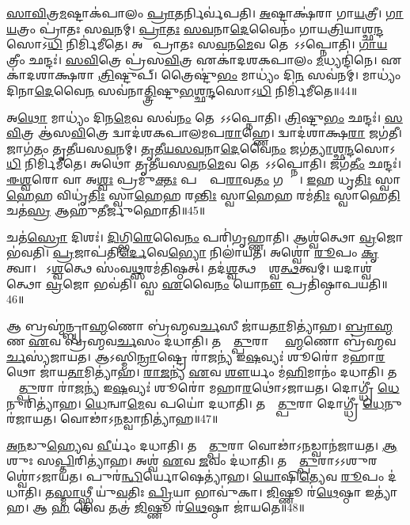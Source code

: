 \ul{𑌸𑌾}\ul{𑌵𑌿}𑌤𑍍𑌰\ul{𑌮}𑌷𑍍𑌟𑌾𑌕॑𑌪𑌾𑌲𑌂 \ul{𑌪𑍍𑌰𑌾}𑌤𑌰𑍍𑌨𑌿𑌰𑍍𑌵॑𑌪𑌤𑌿।
\ul{𑌅}𑌷𑍍𑌟𑌾𑌕𑍍𑌷॑𑌰𑌾 𑌗𑌾\ul{𑌯}𑌤𑍍𑌰𑍀।
\ul{𑌗𑌾}\ul{𑌯}𑌤𑍍𑌰𑌂 𑌪𑍍𑌰𑌾॑𑌤𑌃 𑌸\ul{𑌵}𑌨𑌮𑍍।
\ul{𑌪𑍍𑌰𑌾}\ul{𑌤𑌃} \ul{𑌸}\ul{𑌵}𑌨𑌾\ul{𑌦𑍇}𑌵𑍈𑌨𑌂॑ 𑌗𑌾𑌯\ul{𑌤𑍍𑌰𑌿}𑌯𑌾𑌶𑍍𑌛\ul{𑌨𑍍𑌦}𑌸𑍋\-𑌽\ul{𑌧𑌿} 𑌨𑌿𑌰𑍍𑌮𑌿॑𑌮𑍀𑌤𑍇।
𑌅𑌥𑍋᳚ 𑌪𑍍𑌰𑌾𑌤𑌃 𑌸\ul{𑌵}𑌨\ul{𑌮𑍇}𑌵 𑌤𑍇𑌨𑌾᳚𑌽𑌽𑌪𑍍𑌨𑍋𑌤𑌿।
\ul{𑌗𑌾}\ul{𑌯}𑌤𑍍𑌰𑍀𑌂 𑌛𑌨𑍍𑌦𑌃॑।
\ul{𑌸}\ul{𑌵𑌿}𑌤𑍍𑌰𑍇 𑌪𑍍𑌰॑𑌸\ul{𑌵𑌿}𑌤𑍍𑌰 𑌏𑌕𑌾॑𑌦𑌶𑌕𑌪𑌾𑌲𑌂 \ul{𑌮}𑌧𑍍𑌯𑌨𑍍𑌦𑌿॑𑌨𑍇।
𑌏𑌕𑌾॑𑌦𑌶𑌾𑌕𑍍𑌷𑌰𑌾 \ul{𑌤𑍍𑌰𑌿}𑌷𑍍𑌟𑍁𑌪𑍍।
𑌤𑍍𑌰𑍈𑌷𑍍𑌟𑍁॑\ul{𑌭𑌂} 𑌮𑌾𑌧𑍍𑌯𑌂॑ 𑌦𑌿\ul{𑌨}\ul{} 𑌸𑌵॑𑌨𑌮𑍍।
𑌮𑌾𑌧𑍍𑌯𑌂॑ 𑌦𑌿𑌨𑌾\ul{𑌦𑍇}𑌵𑍈\ul{𑌨}\ul{} 𑌸𑌵॑𑌨𑌾\ul{𑌤𑍍𑌤𑍍𑌰𑌿}𑌷𑍍𑌟𑍁\ul{𑌭}𑌶𑍍𑌛\ul{𑌨𑍍𑌦}𑌸𑍋𑌽\ul{𑌧𑌿} 𑌨𑌿𑌰𑍍𑌮𑌿॑𑌮𑍀𑌤𑍇॥44॥

𑌅\ul{𑌥𑍋} 𑌮𑌾𑌧𑍍𑌯𑌂॑ 𑌦𑌿𑌨\ul{𑌮𑍇}𑌵 𑌸𑌵॑\ul{𑌨𑌂} 𑌤𑍇𑌨𑌾᳚𑌽𑌽𑌪𑍍𑌨𑍋𑌤𑌿।
\ul{𑌤𑍍𑌰𑌿}𑌷𑍍𑌟𑍁\ul{𑌭𑌂} 𑌛𑌨𑍍𑌦𑌃॑।
\ul{𑌸}\ul{𑌵𑌿}𑌤𑍍𑌰 𑌆॑𑌸\ul{𑌵𑌿}𑌤𑍍𑌰𑍇 𑌦𑍍𑌵𑌾𑌦॑𑌶𑌕𑌪𑌾𑌲𑌮𑌪\ul{𑌰𑌾}𑌹𑍍𑌣𑍇।
𑌦𑍍𑌵𑌾𑌦॑𑌶𑌾𑌕𑍍𑌷\ul{𑌰𑌾} 𑌜𑌗॑𑌤𑍀।
𑌜𑌾𑌗॑𑌤𑌂 𑌤𑍃𑌤𑍀𑌯𑌸\ul{𑌵}𑌨𑌮𑍍।
\ul{𑌤𑍃}\ul{𑌤𑍀}\ul{𑌯}\ul{𑌸}\ul{𑌵}𑌨𑌾\ul{𑌦𑍇}𑌵𑍈\ul{𑌨𑌂} 𑌜𑌗॑\ul{𑌤𑍍𑌯𑌾}𑌶𑍍𑌛\ul{𑌨𑍍𑌦}𑌸𑍋𑌽\ul{𑌧𑌿} 𑌨𑌿𑌰𑍍𑌮𑌿॑𑌮𑍀𑌤𑍇।
𑌅𑌥𑍋॑ 𑌤𑍃𑌤𑍀𑌯𑌸\ul{𑌵}𑌨\ul{𑌮𑍇}𑌵 𑌤𑍇𑌨𑌾᳚𑌽𑌽𑌪𑍍𑌨𑍋𑌤𑌿।
𑌜𑌗॑\ul{𑌤𑍀𑌂} 𑌛𑌨𑍍𑌦𑌃॑।
\ul{𑌈}\ul{𑌶𑍍𑌵}𑌰𑍋 𑌵𑌾 𑌅\ul{𑌶𑍍𑌵𑌃} 𑌪𑍍𑌰𑌮𑍁॑\ul{𑌕𑍍𑌤𑌃} 𑌪𑌰𑌾𑌂᳚ 𑌪\ul{𑌰𑌾}𑌵\ul{𑌤𑌂} 𑌗𑌨𑍍𑌤𑍋𑌃᳚।
\ul{𑌇}𑌹 𑌧𑍃\ul{𑌤𑌿𑌃} 𑌸𑍍𑌵𑌾\ul{𑌹𑍇}𑌹 𑌵𑌿𑌧𑍃॑\ul{𑌤𑌿𑌃} 𑌸𑍍𑌵𑌾\ul{𑌹𑍇}𑌹 𑌰\ul{𑌨𑍍𑌤𑌿𑌃} 𑌸𑍍𑌵𑌾\ul{𑌹𑍇}𑌹 𑌰𑌮॑\ul{𑌤𑌿𑌃} 𑌸𑍍𑌵𑌾𑌹𑍇\ul{𑌤𑌿} 𑌚𑌤॑\ul{𑌸𑍍𑌰} 𑌆𑌹𑍁॑𑌤𑍀𑌰𑍍𑌜𑍁𑌹𑍋𑌤𑌿॥45॥

𑌚𑌤॑\ul{𑌸𑍍𑌰𑍋} 𑌦𑌿𑌶𑌃॑।
\ul{𑌦𑌿}𑌗𑍍𑌭𑌿\ul{𑌰𑍇}𑌵𑍈\ul{𑌨𑌂} 𑌪𑌰𑌿॑𑌗𑍃𑌹𑍍𑌣𑌾𑌤𑌿।
𑌆𑌶𑍍𑌵॑𑌤𑍍𑌥𑍋 \ul{𑌵𑍍𑌰}𑌜𑍋 𑌭॑𑌵𑌤𑌿।
\ul{𑌪𑍍𑌰}𑌜𑌾𑌪॑𑌤𑌿\ul{𑌰𑍍𑌦𑍇}𑌵𑍇\ul{𑌭𑍍𑌯𑍋} 𑌨𑌿𑌲𑌾॑𑌯𑌤।
𑌅𑌶𑍍𑌵𑍋॑ \ul{𑌰𑍂}𑌪𑌂 \ul{𑌕𑍃}𑌤𑍍𑌵𑌾।
𑌸𑍋᳚𑌽\ul{𑌶𑍍𑌵}𑌤𑍍𑌥𑍇 𑌸𑌂॑𑌵\ul{𑌥𑍍𑌸}𑌰𑌮॑𑌤𑌿𑌷𑍍𑌠𑌤𑍍।
𑌤𑌦॑\ul{𑌶𑍍𑌵}𑌤𑍍𑌥𑌸𑍍𑌯𑌾᳚𑌶𑍍𑌵\ul{𑌤𑍍𑌥}𑌤𑍍𑌵𑌮𑍍।
𑌯𑌦𑌾𑌶𑍍𑌵॑𑌤𑍍𑌥𑍋 \ul{𑌵𑍍𑌰}𑌜𑍋 𑌭𑌵॑𑌤𑌿।
𑌸𑍍𑌵 \ul{𑌏}𑌵𑍈\ul{𑌨𑌂} 𑌯𑍋\ul{𑌨𑍗} 𑌪𑍍𑌰𑌤𑌿॑\-𑌷𑍍𑌠𑌾𑌪𑌯𑌤𑌿॥46॥\anuvakamend[\ul{𑌤𑍍𑌰𑌿}𑌷𑍍𑌟𑍁\ul{𑌭}𑌶𑍍𑌛\ul{𑌨𑍍𑌦}𑌸𑍋𑌽\ul{𑌧𑌿} 𑌨𑌿𑌰𑍍𑌮𑌿॑𑌮𑍀𑌤𑍇 𑌜𑍁𑌹𑍋\ul{𑌤𑌿} 𑌨𑌵॑ 𑌚]

𑌆 𑌬𑍍𑌰𑌹𑍍𑌮॑𑌨𑍍𑌬𑍍𑌰𑌾\ul{𑌹𑍍𑌮}𑌣𑍋 𑌬𑍍𑌰॑𑌹𑍍𑌮𑌵\ul{𑌰𑍍𑌚}𑌸𑍀 𑌜𑌾॑𑌯\ul{𑌤𑌾}𑌮𑌿𑌤𑍍𑌯𑌾॑𑌹।
\ul{𑌬𑍍𑌰𑌾}\ul{𑌹𑍍𑌮}𑌣 \ul{𑌏}𑌵 𑌬𑍍𑌰॑𑌹𑍍𑌮𑌵\ul{𑌰𑍍𑌚}𑌸𑌂 𑌦॑𑌧𑌾𑌤𑌿।
𑌤𑌸𑍍𑌮𑌾᳚\ul{𑌤𑍍𑌪𑍁}𑌰𑌾 𑌬𑍍𑌰𑌾᳚\ul{𑌹𑍍𑌮}𑌣𑍋 𑌬𑍍𑌰॑𑌹𑍍𑌮𑌵\ul{𑌰𑍍𑌚}𑌸𑍍𑌯॑𑌜𑌾𑌯𑌤।
𑌆𑌽𑌸𑍍𑌮𑌿\ul{𑌨𑍍𑌰𑌾}𑌷𑍍𑌟𑍍𑌰𑍇 𑌰𑌾॑\ul{𑌜}𑌨𑍍𑌯॑ 𑌇\ul{𑌷}𑌵𑍍𑌯𑌃॑ 𑌶𑍂𑌰𑍋॑ 𑌮𑌹𑌾\ul{𑌰}𑌥𑍋 𑌜𑌾॑𑌯\ul{𑌤𑌾}𑌮𑌿𑌤𑍍𑌯𑌾॑𑌹।
\ul{𑌰𑌾}\ul{𑌜}𑌨𑍍𑌯॑ \ul{𑌏}𑌵 \ul{𑌶𑍗}𑌰𑍍𑌯𑌂 𑌮॑\ul{𑌹𑌿}𑌮𑌾𑌨𑌂॑ 𑌦𑌧𑌾𑌤𑌿।
𑌤𑌸𑍍𑌮𑌾᳚\ul{𑌤𑍍𑌪𑍁}𑌰𑌾 𑌰𑌾॑\ul{𑌜}𑌨𑍍𑌯॑ 𑌇\ul{𑌷}𑌵𑍍𑌯𑌃॑ 𑌶𑍂𑌰𑍋॑ 𑌮𑌹𑌾\ul{𑌰}𑌥𑍋॑\-𑌽𑌜𑌾𑌯𑌤।
𑌦𑍋𑌗𑍍𑌧𑍍𑌰𑍀॑ \ul{𑌧𑍇}𑌨𑍁𑌰𑌿𑌤𑍍𑌯𑌾॑𑌹।
\ul{𑌧𑍇}𑌨𑍍𑌵𑌾\ul{𑌮𑍇}𑌵 𑌪𑌯𑍋॑ 𑌦𑌧𑌾𑌤𑌿।
𑌤𑌸𑍍𑌮𑌾᳚\ul{𑌤𑍍𑌪𑍁}𑌰𑌾 𑌦𑍋𑌗𑍍𑌧𑍍𑌰𑍀॑ \ul{𑌧𑍇}𑌨𑍁𑌰॑𑌜𑌾𑌯𑌤।
𑌵𑍋𑌢𑌾॑\-𑌽\ul{𑌨}𑌡𑍍𑌵𑌾𑌨𑌿𑌤𑍍𑌯𑌾॑𑌹॥47॥

\ul{𑌅}\ul{𑌨}𑌡𑍁\ul{𑌹𑍍𑌯𑍇}𑌵 \ul{𑌵𑍀}𑌰𑍍𑌯𑌂॑ 𑌦𑌧𑌾𑌤𑌿।
𑌤𑌸𑍍𑌮𑌾᳚\ul{𑌤𑍍𑌪𑍁}𑌰𑌾 𑌵𑍋𑌢𑌾॑\-𑌽\ul{𑌨}𑌡𑍍𑌵𑌾𑌨॑𑌜𑌾𑌯𑌤।
\ul{𑌆}𑌶𑍁𑌃 𑌸\ul{𑌪𑍍𑌤𑌿}𑌰𑌿𑌤𑍍𑌯𑌾॑𑌹।
𑌅𑌶𑍍𑌵॑ \ul{𑌏}𑌵 \ul{𑌜}𑌵𑌂 𑌦॑𑌧𑌾𑌤𑌿।
𑌤𑌸𑍍𑌮𑌾᳚\ul{𑌤𑍍𑌪𑍁}𑌰𑌾\-𑌽𑌽𑌶𑍁𑌰𑌶𑍍𑌵𑍋॑\-𑌽𑌜𑌾𑌯𑌤।
𑌪𑍁𑌰॑\ul{𑌨𑍍𑌧𑌿}𑌰𑍍𑌯𑍋𑌷𑍇𑌤𑍍𑌯𑌾॑𑌹।
\ul{𑌯𑍋}𑌷𑌿\ul{𑌤𑍍𑌯𑍇}𑌵 \ul{𑌰𑍂}𑌪𑌂 𑌦॑𑌧𑌾𑌤𑌿।
𑌤\ul{𑌸𑍍𑌮𑌾}𑌥𑍍𑌸𑍍𑌤𑍍𑌰𑍀 𑌯𑍁॑\ul{𑌵}𑌤𑌿𑌃 \ul{𑌪𑍍𑌰𑌿}𑌯𑌾 𑌭𑌾𑌵𑍁॑𑌕𑌾।
\ul{𑌜𑌿}𑌷𑍍𑌣𑍂 𑌰॑\ul{𑌥𑍇}𑌷𑍍𑌠𑌾 𑌇𑌤𑍍𑌯𑌾॑𑌹।
𑌆 \ul{𑌹} 𑌵𑍈 𑌤𑌤𑍍𑌰॑ \ul{𑌜𑌿}𑌷𑍍𑌣𑍂 𑌰॑\ul{𑌥𑍇}𑌷𑍍𑌠𑌾 𑌜𑌾॑𑌯𑌤𑍇॥48॥

